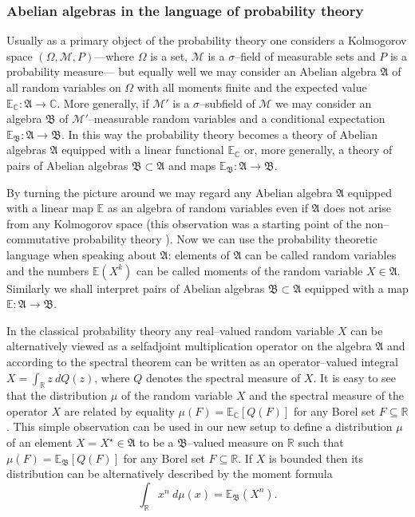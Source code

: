 \documentclass[12pt,dvips]{amsart}
\numberwithin{equation}{section} \numberwithin{figure}{section}
\theoremstyle{plain}
\theoremstyle{definition}
\theoremstyle{remark}
\newcommand{\A}{{\mathfrak{A}}}
\newcommand{\B}{{\mathfrak{B}}}
\newcommand{\E}{{\mathbb{E}}}
\newcommand{\C}{{\mathbb{C}}}
\newcommand{\R}{{\mathbb{R}}}
\newcommand{\gwia}{^{\star}}
\begin{document}
\subsubsection{Abelian algebras in the language of probability theory}

Usually as a primary object of the probability theory one considers
a Kolmogorov space $(\Omega,{\mathcal{M}},P)$---where $\Omega$ is a
set, ${\mathcal{M}}$ is a $\sigma$--field of measurable sets and $P$
is a probability measure--- but equally well we may consider an
Abelian algebra $\A$ of all random variables on $\Omega$ with all
moments finite and the expected value $\E_\C:\A\rightarrow\C$. More
generally, if $\mathcal{M}'$ is a $\sigma$--subfield of
$\mathcal{M}$ we may consider an algebra $\B$ of
$\mathcal{M}'$--measurable random variables and a conditional
expectation $\E_\B:\A\rightarrow\B$. In this way the probability
theory becomes a theory of Abelian algebras $\A$ equipped with a
linear functional $\E_\C$ or, more generally, a theory of pairs of
Abelian algebras $\B\subset\A$ and maps $\E_\B:\A\rightarrow\B$.

By turning the picture around we may regard any Abelian algebra $\A$
equipped with a linear map $\E$ as an algebra of random variables
even if $\A$ does not arise from any Kolmogorov space (this
observation was a starting point of the non--commutative probability
theory \cite{MeyerQuantumprobability}). Now we can use the
probability theoretic language when speaking about $\A$: elements of
$\A$ can be called random variables and the numbers $\E(X^k)$ can be
called moments of the random variable $X\in\A$. Similarly we shall
interpret pairs of Abelian algebras $\B\subset\A$ equipped with a
map $\E:\A\rightarrow\B$.

In the classical probability theory any real--valued random variable
$X$ can be alternatively viewed as a selfadjoint multiplication
operator on the algebra $\A$ and according to the spectral theorem
can be written as an operator--valued integral $X=\int_\R z \
dQ(z)$, where $Q$ denotes the spectral measure of $X$. It is easy to
see that the distribution $\mu$ of the random variable $X$ and the
spectral measure of the operator $X$ are related by equality
$\mu(F)=\E_\C[ Q(F)]$ for any Borel set $F\subseteq\R$. This simple
observation can be used in our new setup to define a distribution
$\mu$ of an element $X=X\gwia\in\A$ to be a $\B$--valued measure on
$\R$ such that $\mu(F)=\E_\B[ Q(F)]$ for any Borel set
$F\subseteq\R$. If $X$ is bounded then its distribution can be
alternatively described by the moment formula
$$\int_\R x^n \ d\mu(x)=\E_\B(X^n).$$
\end{document}
